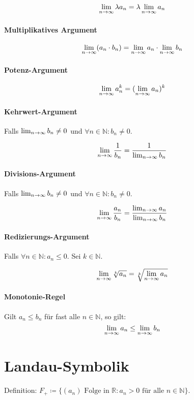 			\[ \lim_{n \to \infty} \lambda a _ n = \lambda \lim_{n \to \infty} a _ n \]

		\paragraph{Multiplikatives Argument}
			\[ \lim_{n \to \infty} (a _ n \cdot b _ n) = \lim_{n \to \infty} a _ n \cdot \lim_{n \to \infty} b _ n \]

		\paragraph{Potenz-Argument}
			\[ \lim_{n \to \infty} a _ n ^ k = (\lim_{n \to \infty} a _ n) ^ k \]

		\paragraph{Kehrwert-Argument}
			Falls $ \lim_{n \to \infty} b _ n \neq 0 $ und $ \forall n \in \mathbb{N} : b _ n \neq 0 $.

			\[ \lim_{n \to \infty} \frac{1}{b _ n} = \frac{1}{\lim_{n \to \infty} b _ n} \]

		\paragraph{Divisions-Argument}
			Falls $ \lim_{n \to \infty} b _ n \neq 0 $ und $ \forall n \in \mathbb{N} : b _ n \neq 0 $.

			\[ \lim_{n \to \infty} \frac{a _ n}{b _ n} = \frac{\lim_{n \to \infty} a _ n}{\lim_{n \to \infty} b _ n} \]

		\paragraph{Redizierungs-Argument}
			Falls $ \forall n \in \mathbb{N} : a _ n \leq 0 $. Sei $ k \in \mathbb{N} $.

			\[ \lim_{n \to \infty} \sqrt[k]{a _ n} = \sqrt[k]{\lim_{n \to \infty} a _ n} \]

		\paragraph{Monotonie-Regel}
			Gilt $ a _ n \leq b _ n $ für fast alle $ n \in \mathbb{N} $, so gilt: \[ \lim_{n \to \infty} a _ n \leq \lim_{n \to \infty} b _ n \]

	\section{Landau-Symbolik}
		Definition: $ F _ + \coloneqq \{ (a _ n) \text{ Folge in } \mathbb{R} : a _ n > 0 \text{ für alle } n \in \mathbb{N} \} $.


